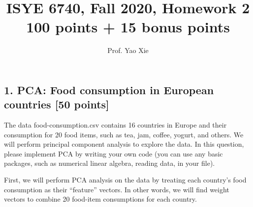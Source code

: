 \documentclass[twoside,12pt]{article}
\begin{document}
\title{ISYE 6740, Fall 2020, Homework 2\\ {\small 100 points + 15 bonus points}}
\author{Prof. Yao Xie}
\date{}
\maketitle

\subsection*{1. PCA: Food consumption in European countries [50 points]}

The data \textsf{food-consumption.csv} contains 16 countries in Europe and their consumption for 20 food items, such as tea, jam, coffee, yogurt, and others. We will perform principal component analysis to explore the data. In this question, please implement PCA by writing your own code (you can use any basic packages, such as numerical linear algebra, reading data, in your file).


\vspace{.1in}
First, we will perform PCA analysis on the data by treating each country's food consumption as their ``feature'' vectors. In other words, we will find weight vectors to combine 20 food-item consumptions for each country.  
 
\end{document}
